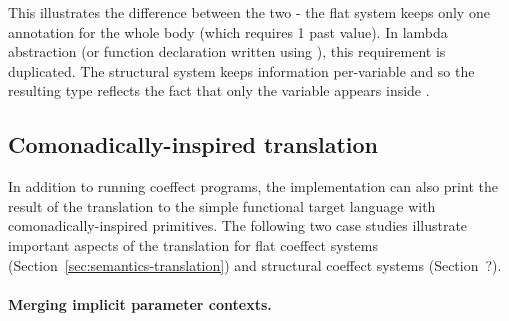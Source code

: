 This illustrates the difference between the two - the flat system keeps only one annotation
for the whole body (which requires 1 past value). In lambda abstraction (or function declaration
written using ), this requirement is duplicated. The structural system keeps information
per-variable and so the resulting type reflects the fact that only the variable  appears
inside .


\subsection{Comonadically-inspired translation}
\label{sec:impl-case-transl}

In addition to running coeffect programs, the implementation can also print the result of the
translation to the simple functional target language with comonadically-inspired primitives.
The following two case studies illustrate important aspects of the translation for flat coeffect
systems (Section~\ref{sec:semantics-translation}) and structural coeffect systems (Section~?).

\paragraph{Merging implicit parameter contexts.}

